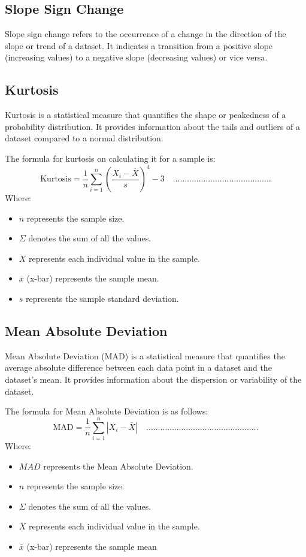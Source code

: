 \subsection{Slope Sign Change}
Slope sign change refers to the occurrence of a change in the direction of the slope or trend of a dataset. It indicates a transition from a positive slope (increasing values) to a negative slope (decreasing values) or vice versa.

\subsection{Kurtosis}
Kurtosis is a statistical measure that quantifies the shape or peakedness of a probability distribution. It provides information about the tails and outliers of a dataset compared to a normal distribution.\par
The formula for kurtosis on calculating it for a sample is:
\begin{equation}
\label{eq: Kurtosis}
\text{Kurtosis} = \frac{1}{n} \sum_{i=1}^{n} \left(\frac{{X_i - \overline{X}}}{{s}}\right)^4 - 3 \quad  \dots \dots \dots \dots \dots \dots \dots \dots \dots \dots \dots \dots \dots \dots 
\end{equation}
Where:
\begin{itemize}
    \item $n$ represents the sample size.
    \item $\Sigma$ denotes the sum of all the values.
    \item $X$ represents each individual value in the sample.
    \item $\bar{x}$ (x-bar) represents the sample mean.
    \item $s$ represents the sample standard deviation.
\end{itemize}

\subsection{Mean Absolute Deviation}
Mean Absolute Deviation (MAD) is a statistical measure that quantifies the average absolute difference between each data point in a dataset and the dataset's mean. It provides information about the dispersion or variability of the dataset.\par
The formula for Mean Absolute Deviation is as follows:
\begin{equation}
\label{eq: Mean Absolute Deviation}
\text{MAD} = \frac{1}{n} \sum_{i=1}^{n} |X_i - \overline{X}| \quad  \dots \dots \dots \dots \dots \dots \dots \dots \dots \dots \dots \dots \dots \dots \dots \dots
\end{equation}
Where:
\begin{itemize}
    \item $MAD$ represents the Mean Absolute Deviation.
    \item $n$ represents the sample size.
    \item $\Sigma$ denotes the sum of all the values.
    \item $X$ represents each individual value in the sample.
    \item $\bar{x}$ (x-bar) represents the sample mean
\end{itemize}


